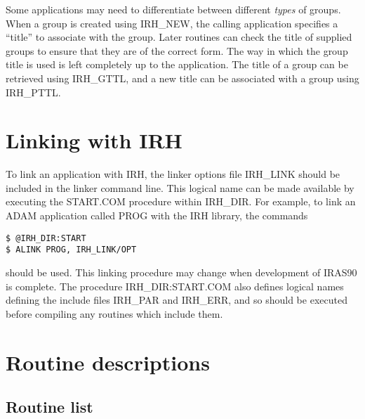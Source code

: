 Some applications may need to differentiate between different {\em types} of
groups. When a group is created using IRH\_NEW, the calling
application specifies a ``title'' to associate with the group. Later routines
can check the title of supplied groups to ensure that they are of the correct
form. The way in which the group title is used is left completely up to the
application. The title of a group can be retrieved using IRH\_GTTL, and a new
title can be associated with a group using IRH\_PTTL. 

\section {Linking with IRH}
To link an application with IRH, the linker options file IRH\_LINK should be
included in the linker command line. This logical name can be made available by
executing the START.COM procedure within IRH\_DIR. For example, to link an ADAM
application called PROG with the IRH library, the commands 

\begin{verbatim}
$ @IRH_DIR:START
$ ALINK PROG, IRH_LINK/OPT 
\end{verbatim}

should be used. This linking procedure may change when development of IRAS90 is
complete. The procedure IRH\_DIR:START.COM also defines logical names defining
the include files IRH\_PAR and IRH\_ERR, and so should be executed before
compiling any routines which include them. 

\appendix

\newcommand{\noteroutine}[2]{{\small \bf #1} \\
                              \hspace*{3em} {\em #2} \\[1.5ex]}

\section {Routine descriptions}

\subsection {Routine list}

